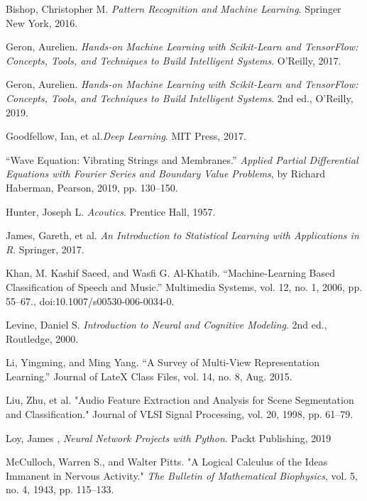 \documentclass[12pt,letterpaper]{article}
\begin{document}

\newpage

\begin{thebibliography}{9}


Bishop, Christopher M. \textit{Pattern Recognition and Machine Learning}. Springer New York, 2016. 

Geron, Aurelien. \textit{Hands-on Machine Learning with Scikit-Learn and TensorFlow: Concepts, Tools, and Techniques to Build Intelligent Systems}. O'Reilly, 2017.

Geron, Aurelien. \textit{Hands-on Machine Learning with Scikit-Learn and TensorFlow: Concepts, Tools, and Techniques to Build Intelligent Systems}. 2nd ed., O'Reilly, 2019.

Goodfellow, Ian, et al.\textit{Deep Learning}. MIT Press, 2017.

“Wave Equation: Vibrating Strings and Membranes.” \textit{Applied Partial Differential Equations with Fourier Series and Boundary Value Problems}, by Richard Haberman, Pearson, 2019, pp. 130–150. 

Hunter, Joseph L. \textit{Acoutics}. Prentice Hall, 1957. 

James, Gareth, et al. \textit{An Introduction to Statistical Learning with Applications in R}. Springer, 2017.

Khan, M. Kashif Saeed, and Wasfi G. Al-Khatib. “Machine-Learning Based Classification of Speech and Music.” Multimedia Systems, vol. 12, no. 1, 2006, pp. 55–67., doi:10.1007/s00530-006-0034-0.

Levine, Daniel S. \textit{Introduction to Neural and Cognitive Modeling}. 2nd ed., Routledge, 2000.

Li, Yingming, and Ming Yang. “A Survey of Multi-View Representation Learning.” Journal of LateX Class Files, vol. 14, no. 8, Aug. 2015. 

Liu, Zhu, et al. "Audio Feature Extraction and Analysis for Scene Segmentation and Classification." Journal of VLSI Signal Processing, vol. 20, 1998, pp. 61–79.

Loy, James , \textit{Neural Network Projects with Python}. Packt Publishing, 2019

McCulloch, Warren S., and Walter Pitts. "A Logical Calculus of the Ideas Immanent in Nervous Activity." \textit{The Bulletin of Mathematical Biophysics}, vol. 5, no. 4, 1943, pp. 115–133.


\end{thebibliography}
\end{document}
